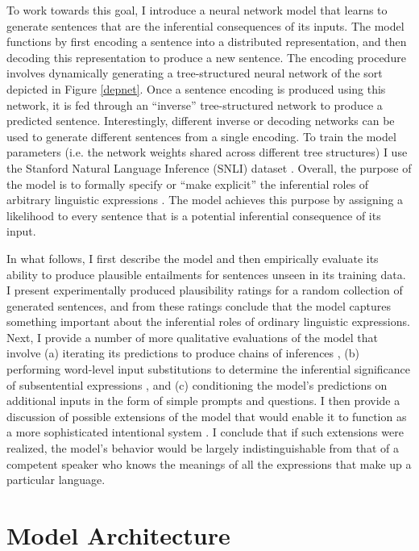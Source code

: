 To work towards this goal, I introduce a neural network model that learns to generate sentences that are the inferential consequences of its inputs. The model functions by first encoding a sentence into a distributed representation, and then decoding this representation to produce a new sentence. The encoding procedure involves dynamically generating a tree-structured neural network of the sort depicted in Figure \ref{depnet}. Once a sentence encoding is produced using this network, it is fed through an ``inverse'' tree-structured network to produce a predicted sentence. Interestingly, different inverse or decoding networks can be used to generate different sentences from a single encoding. To train the model parameters (i.e. the network weights shared across different tree structures) I use the Stanford Natural Language Inference (SNLI) dataset \citep{Bowman:2015}. Overall, the purpose of the model is to formally specify or ``make explicit'' the inferential roles of arbitrary linguistic expressions \citep{Brandom:1994}. The model achieves this purpose by assigning a likelihood to every sentence that is a potential inferential consequence of its input. 

In what follows, I first describe the model and then empirically evaluate its ability to produce plausible entailments for sentences unseen in its training data. I present experimentally produced plausibility ratings for a random collection of generated sentences, and from these ratings conclude that the model captures something important about the inferential roles of ordinary linguistic expressions. Next, I provide a number of more qualitative evaluations of the model that involve (a) iterating its predictions to produce chains of inferences \citep{Kolesnyk:2016}, (b) performing word-level input substitutions to determine the inferential significance of subsentential expressions \citep{Brandom:2000,Brandom:1994}, and (c) conditioning the model's predictions on additional inputs in the form of simple prompts and questions. I then provide a discussion of possible extensions of the model that would enable it to function as a more sophisticated intentional system \citep{Dennett:1991,Dennett:1987}. I conclude that if such extensions were realized, the model's behavior would be largely indistinguishable from that of a competent speaker who knows the meanings of all the expressions that make up a particular language.

\section{Model Architecture}

